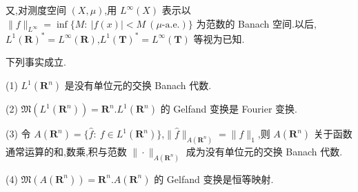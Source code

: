 又,对测度空间 $(X, \mu)$,用 $L^{\infty}(X)$ 表示以 $\|f\|_{L^{\infty}} = \inf\{M:\ |f(x)| < M\ (\mu\text{-a.e.})\}$ 为范数的 Banach 空间.以后,$L^{1}(\mathbf{R})^{*} = L^{\infty}(\mathbf{R})$,$L^{1}(\mathbf{T})^{*} = L^{\infty}(\mathbf{T})$ 等视为已知.

\begin{theorem}\label{thm:3.2.5}
下列事实成立.

(1) $L^{1}(\mathbf{R}^{n})$ 是没有单位元的交换 Banach 代数.

(2) $\mathfrak{M}(L^{1}(\mathbf{R}^{n})) = \mathbf{R}^{n}$.$L^{1}(\mathbf{R}^{n})$ 的 Gelfand 变换是 Fourier 变换.

(3) 令 $A(\mathbf{R}^{n}) = \{\hat{f}:\ f \in L^{1}(\mathbf{R}^{n})\}$,$\|\hat{f}\|_{A(\mathbf{R}^{n})} = \|f\|_{1}$,则 $A(\mathbf{R}^{n})$ 关于函数通常运算的和,数乘,积与范数 $\|\cdot\|_{A(\mathbf{R}^{n})}$ 成为没有单位元的交换 Banach 代数.

(4) $\mathfrak{M}(A(\mathbf{R}^{n})) = \mathbf{R}^{n}$.$A(\mathbf{R}^{n})$ 的 Gelfand 变换是恒等映射.
\end{theorem}

